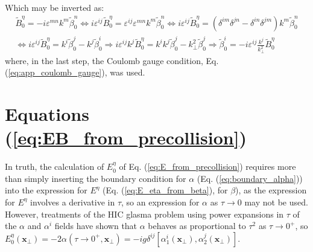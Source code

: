Which may be inverted as:
\begin{equation}
\begin{split}
	\tilde{B}^\eta_0 = - i \varepsilon^{mn} k^m \tilde{\beta}^n_0 
	\Leftrightarrow i \varepsilon^{ij} \tilde{B}^\eta_0 = \varepsilon^{ij} \varepsilon^{mn} k^m \tilde{\beta}^n_0
	\Leftrightarrow i \varepsilon^{ij} \tilde{B}^\eta_0 = \left(\delta^{im}\delta^{jn} - \delta^{in}\delta^{jm} \right) k^m \tilde{\beta}^n_0 
	\\ \Leftrightarrow i \varepsilon^{ij} \tilde{B}^\eta_0 = k^i \tilde{\beta}^j_0 - k^j \tilde{\beta}^i_0 
	\Rightarrow i \varepsilon^{ij} k^j \tilde{B}^\eta_0 =   k^i k^j \tilde{\beta}^j_0  - k_\perp^2 \tilde{\beta}^j_0
	 \Rightarrow \tilde{\beta}^i_0 = - i \varepsilon^{ij} \frac{k^j}{k_\perp^2} \tilde{B}^\eta_0
\end{split} 
\end{equation}
where, in the last step, the Coulomb gauge condition, Eq. (\ref{eq:app_coulomb_gauge}), was used.

\section{Equations (\ref{eq:EB_from_precollision})}
\label{ap:EB_from_precollision}

In truth, the calculation of $E^\eta_0$ of Eq. (\ref{eq:E_from_precollision}) requires more than simply inserting the boundary condition for $\alpha$ (Eq. (\ref{eq:boundary_alpha})) into the expression for $E^\eta$ (Eq. (\ref{eq:E_eta_from_beta}), for $\beta$), as the expression for $E^\eta$ involves a derivative in $\tau$, so an expression for $\alpha$ as $\tau \to 0$ may not be used. However, treatments of the HIC glasma problem using power expansions in $\tau$ of the $\alpha$ and $\alpha^i$ fields \cite{Chen:2015wia} have shown that $\alpha$ behaves as proportional to $\tau^2$ as $\tau \to 0^+$, so $E^\eta_0 (\mathbf{x}_\perp) = -2 \alpha(\tau \to 0^+, \mathbf{x}_\perp) = -ig \delta^{ij} \left[ \alpha_1^i(\mathbf{x}_\perp), \alpha_2^j(\mathbf{x}_\perp) \right]$.

\color{red}

